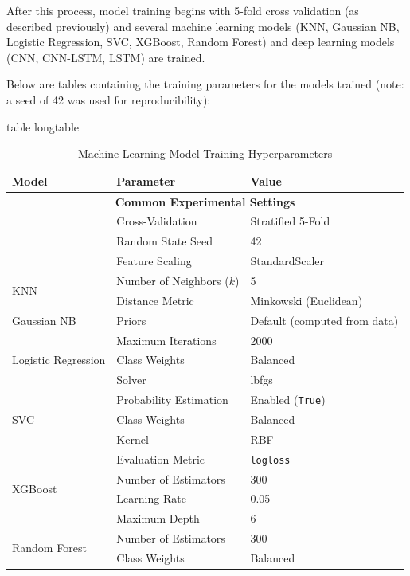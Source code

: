\documentclass[stu,12pt,floatsintext,donotrepeattitle]{apa7}
\makeatletter
\let\origcaption\caption
\newcommand{\@tabletype}{table}
\newcommand{\@longtabletype}{longtable}
\DeclareRobustCommand{\caption}[2][]{%
    \ifx\relax#1\relax
      \origcaption{#2}%
      \def\temp@cap{#2}%
    \else
      \origcaption[#1]{#2}%
      \def\temp@cap{#1}%
    \fi
    \ifx\@captype\@tabletype
      \ifx\@currenvir\@longtabletype\else
        \addcontentsline{lot}{table}{\protect\numberline{\thetable}{\ignorespaces\temp@cap}}%
      \fi
    \fi
  }%
\let\oldcaption\caption
\renewcommand{\caption}[2][]{%
    \oldcaption[#1]{#2}%
    \vspace{-12pt}%
  }%
\makeatother
\begin{document}
After this process, model training begins with 5-fold cross validation (as described previously) and several machine learning models (KNN, Gaussian NB, Logistic Regression, SVC, XGBoost, Random Forest) and deep learning models (CNN, CNN-LSTM, LSTM) are trained. 

Below are tables containing the training parameters for the models trained (note: a seed of 42 was used for reproducibility): 

\vspace{25pt}

\begin{table}[H]
    \centering
    \caption{Machine Learning Model Training Hyperparameters}
    \label{tab:ml_model_params}
    \begin{tabular}{l l l}
        \hline
        \textbf{Model} & \textbf{Parameter} & \textbf{Value} \\
        \hline
        \multicolumn{3}{c}{\textbf{Common Experimental Settings}} \\
        & Cross-Validation & Stratified 5-Fold \\
        & Random State Seed & 42 \\
        & Feature Scaling & StandardScaler \\
        \hline
        \multirow{2}{*}{KNN} & Number of Neighbors ($k$) & 5 \\
        & Distance Metric & Minkowski (Euclidean) \\
        \hline
        Gaussian NB & Priors & Default (computed from data) \\
        \hline
        \multirow{3}{*}{Logistic Regression} & Maximum Iterations & 2000 \\
        & Class Weights & Balanced \\
        & Solver & lbfgs \\
        \hline
        \multirow{3}{*}{SVC} & Probability Estimation & Enabled (\texttt{True}) \\
        & Class Weights & Balanced \\
        & Kernel & RBF \\
        \hline
        \multirow{4}{*}{XGBoost} & Evaluation Metric & \texttt{logloss} \\
        & Number of Estimators & 300 \\
        & Learning Rate & 0.05 \\
        & Maximum Depth & 6 \\
        \hline
        \multirow{2}{*}{Random Forest} & Number of Estimators & 300 \\
        & Class Weights & Balanced \\
        \hline
    \end{tabular}
\end{table}
\end{document}
